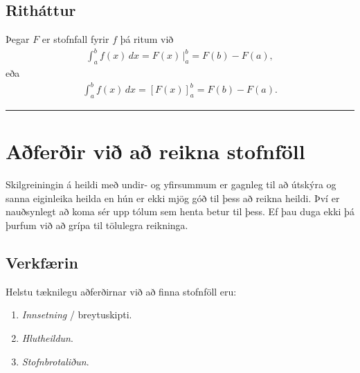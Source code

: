 \documentclass[a4paper,10pt,icelandic]{sphinxmanual}
\begin{document}
\subsection{Ritháttur}
\label{\detokenize{kafli06:rithattur}}
Þegar \(F\) er stofnfall fyrir \(f\) þá ritum við
\begin{equation*}
\begin{split}\int_a^b f(x)\,dx=F(x)\,\bigg|_a^b= F(b)-F(a),\end{split}
\end{equation*}
eða
\begin{equation*}
\begin{split}\int_a^b f(x)\,dx=\left[F(x)\right]_a^b= F(b)-F(a).\end{split}
\end{equation*}

\bigskip\hrule\bigskip



\section{Aðferðir við að reikna stofnföll}
\label{\detokenize{kafli06:aferir-vi-a-reikna-stofnfoll}}
Skilgreiningin á heildi með undir- og yfirsummum er gagnleg til að útskýra
og sanna eiginleika heilda en hún er ekki mjög góð til þess að reikna
heildi. Því er nauðsynlegt að koma sér upp tólum sem henta betur til þess.
Ef þau duga ekki þá þurfum við að grípa til tölulegra reikninga.


\subsection{Verkfærin}
\label{\detokenize{kafli06:verkfaerin}}
Helstu tæknilegu aðferðirnar við að finna stofnföll eru:
\begin{enumerate}
\item {} 
\textit{Innsetning} / breytuskipti.

\item {} 
\textit{Hlutheildun}.

\item {} 
\textit{Stofnbrotaliðun}.

\end{enumerate}
\end{document}
